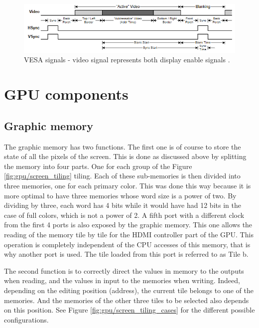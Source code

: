 \begin{figure}[H]
    \centering
    \includegraphics[width=\linewidth]{Chapter4-GPU_CLKU/res/vesa_signals.PNG}
    \caption{VESA signals - video signal represents both display enable signals \cite{vesa}.}
    \label{fig:gpu/vesa_signals}
\end{figure}

\section{GPU components}

\subsection{Graphic memory}

The graphic memory has two functions. The first one is of course to store the state of all the 
pixels of the screen. This is done as discussed above by splitting the memory into four parts. One 
for each group of the Figure \ref{fig:gpu/screen_tiling} tiling. Each of these sub-memories is then 
divided into three memories, one for 
each primary color. This was done this way because it is more optimal to have three memories whose 
word size is a power of two. By dividing by three, each word has 4 bits while it would have had 
12 bits in the case of full colors, which is not a power of 2. A fifth port with a different clock 
from the first 4 ports is also exposed by the graphic memory. This one allows the reading of the 
memory tile by tile for the HDMI controller part of the GPU. This operation is completely independent
of the CPU accesses of this memory, that is why another port is used. The tile loaded from this port
is referred to as Tile b.

The second function is to correctly direct the values in memory to the outputs when reading, and 
the values in input to the memories when writing. Indeed, depending on the editing position (address), the 
current tile belongs to one of the memories. And the memories of the other three tiles to be 
selected also depends on this position. See Figure \ref{fig:gpu/screen_tiling_cases} for the different 
possible configurations. 

